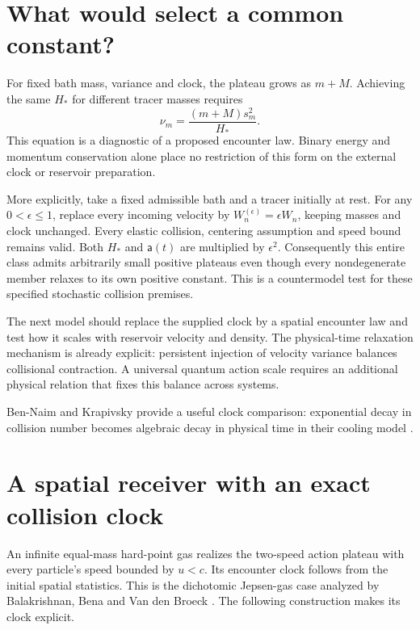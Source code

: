 \documentclass[11pt,a4paper]{article}
\begin{document}
\section{What would select a common constant?}
For fixed bath mass, variance and clock, the plateau grows as $m+M$.
Achieving the same $H_*$ for different tracer masses requires
\begin{equation}\label{eq:universality}
 \nu_m=\frac{(m+M)s_m^2}{H_*}.
\end{equation}
This equation is a diagnostic of a proposed encounter law. Binary energy and
momentum conservation alone place no restriction of this form on the external
clock or reservoir preparation.

More explicitly, take a fixed admissible bath and a tracer initially at rest.
For any $0<\epsilon\le1$, replace every incoming velocity by
$W_n^{(\epsilon)}=\epsilon W_n$, keeping masses and clock unchanged.
Every elastic collision, centering assumption and speed bound remains valid.
Both $H_*$ and $\mathsf a(t)$ are multiplied by $\epsilon^2$.
Consequently this entire class admits arbitrarily small positive plateaus even
though every nondegenerate member relaxes to its own positive constant.
This is a countermodel test for these specified stochastic collision premises.

The next model should replace the supplied clock by a spatial encounter law
and test how it scales with reservoir velocity and density. The physical-time
relaxation mechanism is already explicit: persistent injection of velocity
variance balances collisional contraction. A universal quantum action scale
requires an additional physical relation that fixes this balance across systems.

Ben-Naim and Krapivsky provide a useful clock comparison: exponential decay
in collision number becomes algebraic decay in physical time in their cooling
model \cite[p.~6, (14)--(17)]{BenNaimKrapivsky2003InelasticMaxwell}.

\section{A spatial receiver with an exact collision clock}\label{sec:spatial}
An infinite equal-mass hard-point gas realizes the two-speed action plateau
with every particle's speed bounded by $u<c$. Its encounter clock follows
from the initial spatial statistics. This is the dichotomic Jepsen-gas case
analyzed by Balakrishnan, Bena and Van den Broeck
\cite[pp.~7--8, (11)--(12), pp.~17--19]{BalakrishnanBenaVanDenBroeck2002}.
The following construction makes its clock explicit.
\end{document}
